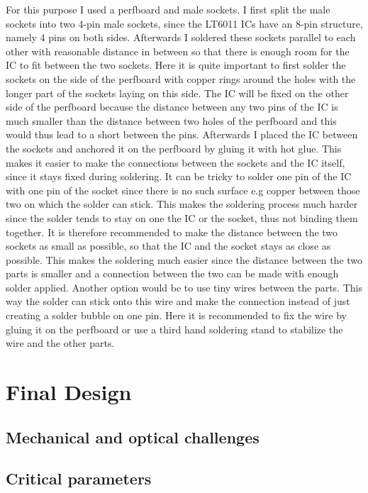 For this purpose I used a perfboard and male sockets. I first split the male sockets into two 4-pin male sockets, since the LT6011 ICs have an 8-pin structure, namely 4 pins on both sides. Afterwards I soldered these sockets parallel to each other with reasonable distance in between so that there is enough room for the IC to fit between the two sockets. Here it is quite important to first solder the sockets on the side of the perfboard with copper rings around the holes with the longer part of the sockets laying on this side. The IC will be fixed on the other side of the perfboard because the distance between any two pins of the IC is much smaller than the distance between two holes of the perfboard and this would thus lead to a short between the pins. Afterwards I placed the IC between the sockets and anchored it on the perfboard by gluing it with hot glue. This makes it easier to make the connections between the sockets and the IC itself, since it stays fixed during soldering. It can be tricky to solder one pin of the IC with one pin of the socket since there is no such surface e.g copper between those two on which the solder can stick. This makes the soldering process much harder since the solder tends to stay on one the IC or the socket, thus not binding them together. It is therefore recommended to make the distance between the two sockets as small as possible, so that the IC and the socket stays as close as possible. This makes the soldering much easier since the distance between the two parts is smaller and a connection between the two can be made with enough solder applied. Another option would be to use tiny wires between the parts. This way the solder can stick onto this wire and make the connection instead of just creating a solder bubble on one pin. Here it is recommended to fix the wire by gluing it on the perfboard or use a third hand soldering stand to stabilize the wire and the other parts.     

\section{Final Design}
\subsection{Mechanical and optical challenges}


\subsection{Critical parameters}
\label{sub:criticalParameters}

